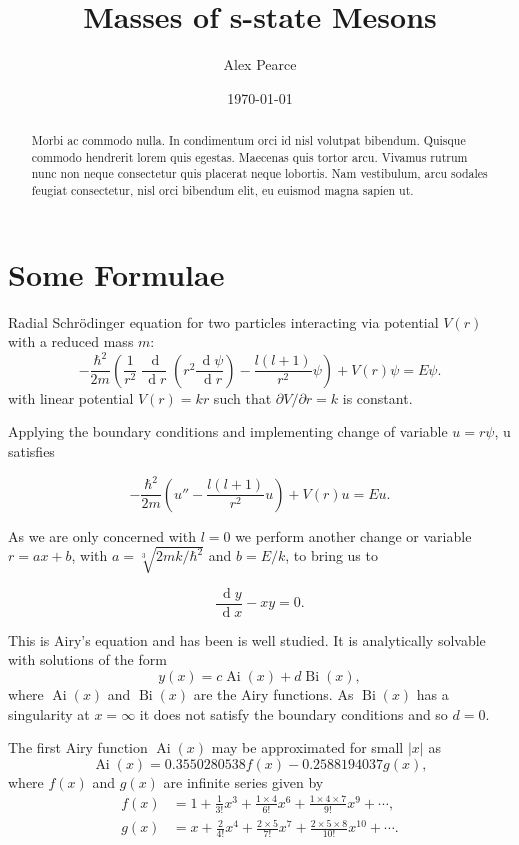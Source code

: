 \documentclass[]{article}
\renewcommand{\d}[1]{\ensuremath{\,\operatorname{d}\!{#1}}}
\renewcommand{\mod}[1]{\ensuremath{\lvert {#1} \rvert}}
\newcommand{\Ai}[1]{\ensuremath{\operatorname{Ai}({#1})}}
\newcommand{\Bi}[1]{\ensuremath{\operatorname{Bi}({#1})}}
\begin{document}
\title{Masses of s-state Mesons}
\author{Alex Pearce}
\date{\today}
\maketitle


\begin{abstract}
Morbi ac commodo nulla. In condimentum orci id nisl volutpat bibendum. Quisque commodo hendrerit lorem quis egestas. Maecenas quis tortor arcu. Vivamus rutrum nunc non neque consectetur quis placerat neque lobortis. Nam vestibulum, arcu sodales feugiat consectetur, nisl orci bibendum elit, eu euismod magna sapien ut.
\end{abstract}

\section{Some Formulae}

Radial Schr\"{o}dinger equation for two particles interacting via potential $V(r)$ with a reduced mass $m$:
\[
-\frac{\hbar^{2}}{2m}\left (
	\frac{1}{r^{2}} \frac{\d{}}{\d{r}} \left (
		r^{2} \frac{\d{\psi}}{\d{r}}
	\right )
	- \frac{l(l+1)}{r^{2}}\psi
\right )
+ V(r)\psi = E\psi.
\]
with linear potential $V(r) = kr$ such that $\partial V / \partial r = k$ is constant.

Applying the boundary conditions and implementing change of variable $u = r\psi$, u satisfies

\[
-\frac{\hbar^{2}}{2m}\left (
	u''
	- \frac{l(l+1)}{r^{2}}u
\right )
+ V(r)u = Eu.
\]

As we are only concerned with $l = 0$ we perform another change or variable $r = ax + b$, with $a = \sqrt[3]{2mk/\hbar^{2}}$ and $b = E/k$, to bring us to

\[
\frac{\d{y}}{\d{x}} - xy = 0.
\]

This is Airy's equation and has been is well studied. It is analytically solvable with solutions of the form
\[
y(x) = c\Ai{x} + d\Bi{x},
\]
where $\Ai{x}$ and $\Bi{x}$ are the Airy functions. As $\Bi{x}$ has a singularity at $x=\infty$ it does not satisfy the boundary conditions and so $d=0$.

The first Airy function $\Ai{x}$ may be approximated for small $\mod{x}$ as
\[
\Ai{x} = 0.3550280538f(x) - 0.2588194037g(x),
\]
where $f(x)$ and $g(x)$ are infinite series given by
\begin{align*}
f(x) &= 1 + \frac{1}{3!}x^{3} + \frac{1\times4}{6!}x^{6} + \frac{1\times4\times{7}}{9!}x^{9} + \dotsb,\\
g(x) &= x + \frac{2}{4!}x^{4} + \frac{2\times5}{7!}x^{7} + \frac{2\times5\times{8}}{10!}x^{10} + \dotsb.
\end{align*}
\end{document}
